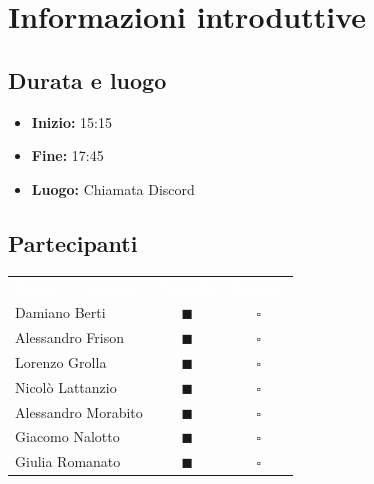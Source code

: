 \documentclass[a4paper, 11pt]{article}
\begin{document}

\section{Informazioni introduttive}

\subsection{Durata e luogo}
\begin{itemize}
    \item \textbf{Inizio:} 15:15
    \item \textbf{Fine:} 17:45
    \item \textbf{Luogo:} Chiamata Discord
\end{itemize}

\subsection{Partecipanti}
\begin{center}
    \begin{tabular}{>{\raggedright\arraybackslash}p{6cm} c c}
        \rowcolor{AccentColor}
        \textcolor{white}{\textbf{Nome e Cognome}} & 
        \textcolor{white}{\textbf{Presente}} & 
        \textcolor{white}{\textbf{Assente}} \\
        
        Damiano Berti     & \textcolor{AccentColor}{$\blacksquare$}    & $\square$        \\
        Alessandro Frison     & \textcolor{AccentColor}{$\blacksquare$}    & $\square$        \\
        Lorenzo Grolla     & \textcolor{AccentColor}{$\blacksquare$}    & $\square$        \\
        Nicolò Lattanzio    & \textcolor{AccentColor}{$\blacksquare$}    & $\square$        \\
        Alessandro Morabito   & \textcolor{AccentColor}{$\blacksquare$}    & $\square$        \\
        Giacomo Nalotto   & \textcolor{AccentColor}{$\blacksquare$}    & $\square$        \\
        Giulia Romanato   & \textcolor{AccentColor}{$\blacksquare$}    & $\square$        \\
    \end{tabular}
\end{center}
\end{document}
